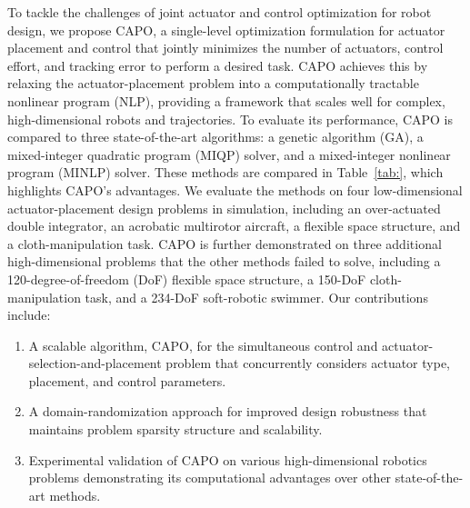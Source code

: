 To tackle the challenges of joint actuator and control optimization for robot design, we propose CAPO, a single-level optimization formulation for actuator placement and control that jointly minimizes the number of actuators, control effort, and tracking error to perform a desired task. CAPO achieves this by relaxing the actuator-placement problem into a computationally tractable nonlinear program (NLP), providing a framework that scales well for complex, high-dimensional robots and trajectories. To evaluate its performance, CAPO is compared to three state-of-the-art algorithms: a genetic algorithm (GA)\cite{wildart2022}, a mixed-integer quadratic program (MIQP) solver\cite{gurobi}, and a mixed-integer nonlinear program (MINLP) solver\cite{juniper}. These methods are compared in Table~\ref{tab:}, which highlights CAPO's advantages. We evaluate the methods on four low-dimensional actuator-placement design problems in simulation, including an over-actuated double integrator, an acrobatic multirotor aircraft, a flexible space structure, and a cloth-manipulation task. CAPO is further demonstrated on three additional high-dimensional problems that the other methods failed to solve, including a 120-degree-of-freedom (DoF) flexible space structure, a 150-DoF cloth-manipulation task, and a 234-DoF soft-robotic swimmer.
Our contributions include: %
\begin{enumerate}
\item A scalable algorithm, CAPO, for the simultaneous control and actuator-selection-and-placement problem that concurrently considers actuator type, placement, and control parameters.
\item {A domain-randomization approach for improved design robustness that maintains problem sparsity structure and scalability.}
\item Experimental validation of CAPO on various high-dimensional robotics problems demonstrating its computational advantages over other state-of-the-art methods.
\end{enumerate}

